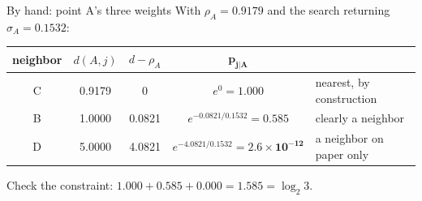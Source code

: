 \documentclass[aspectratio=169]{beamer}
\begin{document}
\begin{frame}{By hand: point A's three weights}
  With $\rho_A = 0.9179$ and the search returning $\sigma_A = 0.1532$:
  \vskip 4pt
  \begin{center}\small
    \renewcommand{\arraystretch}{1.4}
    \begin{tabular}{c c c c l}
      \toprule
      \textbf{neighbor} & $d(A,j)$ & $d - \rho_A$ & $\bm{p_{j|A}}$ & \\
      \midrule
      C & 0.9179 & 0 & $e^{0} = \mathbf{1.000}$ & nearest, by construction \\
      B & 1.0000 & 0.0821 & $e^{-0.0821/0.1532} = \mathbf{0.585}$ & clearly a neighbor \\
      D & 5.0000 & 4.0821 & $e^{-4.0821/0.1532} = \mathbf{2.6\!\times\!10^{-12}}$ & a neighbor
        on paper only \\
      \bottomrule
    \end{tabular}
  \end{center}
  \vskip 6pt
  Check the constraint: $1.000 + 0.585 + 0.000 = \mathbf{1.585} = \log_2 3$. \checkmark
  \vfill
\end{frame}
\end{document}
